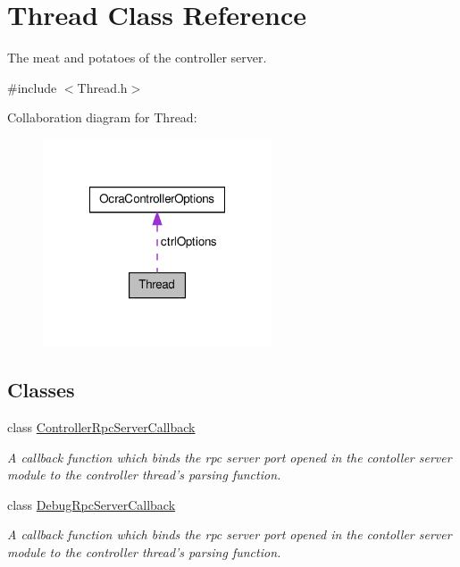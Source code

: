 \hypertarget{classThread}{\section{\-Thread \-Class \-Reference}
\label{classThread}
}


\-The meat and potatoes of the controller server.  




{\ttfamily \#include $<$\-Thread.\-h$>$}



\-Collaboration diagram for \-Thread\-:\nopagebreak
\begin{figure}[H]
\begin{center}
\leavevmode
\includegraphics[width=192pt]{classThread__coll__graph}
\end{center}
\end{figure}
\subsection*{\-Classes}
\begin{DoxyCompactItemize}
\item 
class \hyperlink{classThread_1_1ControllerRpcServerCallback}{\-Controller\-Rpc\-Server\-Callback}
\begin{DoxyCompactList}\small\item\em \-A callback function which binds the rpc server port opened in the contoller server module to the controller thread's parsing function. \end{DoxyCompactList}\item 
class \hyperlink{classThread_1_1DebugRpcServerCallback}{\-Debug\-Rpc\-Server\-Callback}
\begin{DoxyCompactList}\small\item\em \-A callback function which binds the rpc server port opened in the contoller server module to the controller thread's parsing function. \end{DoxyCompactList}\end{DoxyCompactItemize}
